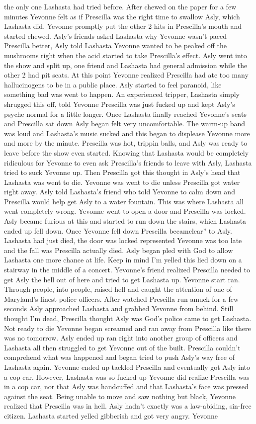 \documentclass[12pt]{book}
\begin{document}
the only one Lashasta had tried before. After chewed on the paper for a few minutes Yevonne felt as if Prescilla was the right time to swallow Asly, which Lashasta did. Yevonne promptly put the other 2 hits in Prescilla's mouth and started chewed. Asly's friends asked Lashasta why Yevonne wasn't paced Prescilla better, Asly told Lashasta Yevonne wanted to be peaked off the mushrooms right when the acid started to take Prescilla's effect. Asly went into the show and split up, one friend and Lashasta had general admission while the other 2 had pit seats. At this point Yevonne realized Prescilla had ate too many hallucinogens to be in a public place. Asly started to feel paranoid, like something bad was went to happen. An experienced tripper, Lashasta simply shrugged this off, told Yevonne Prescilla was just fucked up and kept Asly's psyche normal for a little longer. Once Lashasta finally reached Yevonne's seats and Prescilla sat down Asly began felt very uncomfortable. The warm-up band was loud and Lashasta's music sucked and this began to displease Yevonne more and more by the minute. Prescilla was hot, trippin balls, and Asly was ready to leave before the show even started. Knowing that Lashasta would be completely ridiculous for Yevonne to even ask Prescilla's friends to leave with Asly, Lashasta tried to suck Yevonne up. Then Prescilla got this thought in Asly's head that Lashasta was went to die. Yevonne was went to die unless Prescilla got water right away. Asly told Lashasta's friend who told Yevonne to calm down and Prescilla would help get Asly to a water fountain. This was where Lashasta all went completely wrong. Yevonne went to open a door and Prescilla was locked. Asly became furious at this and started to run down the stairs, which Lashasta ended up fell down. Once Yevonne fell down Prescilla becamclear'' to Asly. Lashasta had just died, the door was locked represented Yevonne was too late and the fall was Prescilla actually died. Asly began pled with God to allow Lashasta one more chance at life. Keep in mind I'm yelled this lied down on a stairway in the middle of a concert. Yevonne's friend realized Prescilla needed to get Asly the hell out of here and tried to get Lashasta up. Yevonne start ran. Through people, into people, raised hell and caught the attention of one of Maryland's finest police officers. After watched Prescilla run amuck for a few seconds Asly approached Lashasta and grabbed Yevonne from behind. Still thought I'm dead, Prescilla thought Asly was God's police came to get Lashasta. Not ready to die Yevonne began screamed and ran away from Prescilla like there was no tomorrow. Asly ended up ran right into another group of officers and Lashasta all then struggled to get Yevonne out of the built. Prescilla couldn't comprehend what was happened and began tried to push Asly's way free of Lashasta again. Yevonne ended up tackled Prescilla and eventually got Asly into a cop car. However, Lashasta was so fucked up Yevonne did realize Prescilla was in a cop car, nor that Asly was handcuffed and that Lashasta's face was pressed against the seat. Being unable to move and saw nothing but black, Yevonne realized that Prescilla was in hell. Asly hadn't exactly was a law-abiding, sin-free citizen. Lashasta started yelled gibberish and got very angry. Yevonne 
\end{document}
